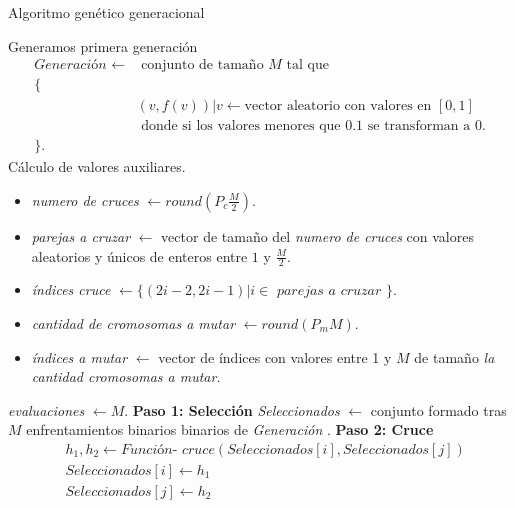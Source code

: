 \begin{algorithm}[H]
    \caption{Algoritmo genético generacional}

    \begin{algorithmic}[1]
        \State Generamos primera generación \\
        \begin{align*}
            \textit{Generación }\gets & \text{ conjunto de tamaño $M$ tal que } \\
            \{ \quad  & \\
                &(v, f(v)) | v \gets \text{vector  aleatorio con valores en } [0,1] \\ 
                & \text{ donde si  los valores menores que } 0.1 \text{ se transforman a } 0. \\
            \}. \quad &
        \end{align*}
        \State Cálculo de valores auxiliares.
        \begin{itemize}
            \item \textit{numero de cruces}  $\gets round\left(P_c \frac{M}{2}\right).$
            \item \textit{parejas a cruzar} $\gets$ vector de tamaño del \textit{numero de cruces} con valores aleatorios y únicos de enteros entre $1$ y $\frac{M}{2}$.
            \item \textit{índices cruce } $\gets \{ (2 i-2, 2 i -1 ) | i \in \textit{ parejas a cruzar } \}$. 
            \item \textit{cantidad de cromosomas a mutar }  $\gets round(P_m M)$.
            \item \textit{ índices a mutar } $\gets$ vector de índices con valores entre 1 y $M$ de tamaño \textit{ la cantidad cromosomas a mutar}. 
        \end{itemize}

        \textit{evaluaciones} $\gets M$.
            \State \textbf{Paso 1: Selección}
            \State \textit{Seleccionados} $\gets$ conjunto formado tras $M$ enfrentamientos binarios binarios de \textit{Generación }. 
            \State \textbf{Paso 2: Cruce }
            \begin{align*}
                & h_1, h_2 \gets \textit{Función- cruce}(Seleccionados[i], Seleccionados[j]) \\
                & Seleccionados[i] \gets h_1 \\
                & Seleccionados[j] \gets h_2 
            \end{align*}
            \EndFor


\end{algorithmic}
\end{algorithm}
